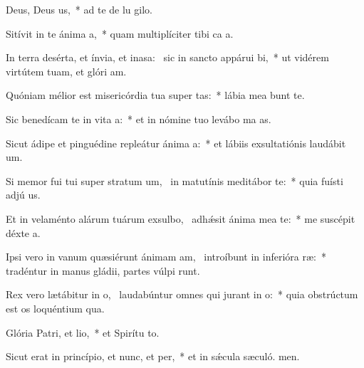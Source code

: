 \item Deus, Deus us,~* ad te de lu gilo.
\item Sitívit in te ánima a,~* quam multiplíciter tibi ca a.
\item In terra desérta, et ínvia, et inasa:~\pscross{} sic in sancto appárui bi,~* ut vidérem virtútem tuam, et glóri am.
\item Quóniam mélior est misericórdia tua super tas:~* lábia mea bunt te.
\item Sic benedícam te in vita a:~* et in nómine tuo levábo ma as.
\item Sicut ádipe et pinguédine repleátur ánima a:~* et lábiis exsultatiónis laudábit  um.
\item Si memor fui tui super stratum um,~\pscross{} in matutínis meditábor  te:~* quia fuísti adjú us.
\item Et in velaménto alárum tuárum exsulbo,~\pscross{} adhǽsit ánima mea  te:~* me suscépit déxte a.
\item Ipsi vero in vanum quæsiérunt ánimam am,~\pscross{} introíbunt in inferióra ræ:~* tradéntur in manus gládii, partes vúlpi runt.
\item Rex vero lætábitur in o,~\pscross{} laudabúntur omnes qui jurant in o:~* quia obstrúctum est os loquéntium qua.
\item Glória Patri, et lio,~* et Spirítu to.
\item Sicut erat in princípio, et nunc, et per,~* et in sǽcula sæculó. men.
